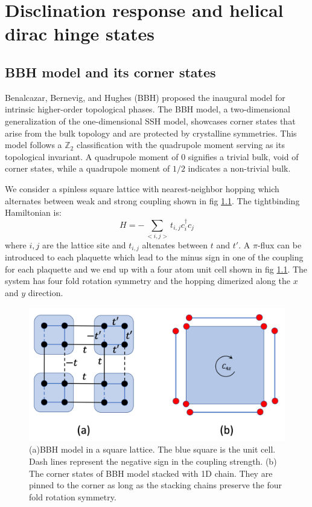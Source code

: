 \chapter{Disclination response and helical dirac hinge states}
\section{BBH model and its corner states}
Benalcazar, Bernevig, and Hughes (BBH) proposed the inaugural model for intrinsic higher-order topological phases\cite{benalcazar2017quantized}. The BBH model, a two-dimensional generalization of the one-dimensional SSH model, showcases corner states that arise from the bulk topology and are protected by crystalline symmetries. This model follows a $\mathbb{Z}_2$ classification with the quadrupole moment serving as its topological invariant. A quadrupole moment of 0 signifies a trivial bulk, void of corner states, while a quadrupole moment of $1/2$ indicates a non-trivial bulk.

 We consider a spinless square lattice with nearest-neighbor hopping which alternates between weak and strong coupling shown in fig \ref{fig:bbh}. The tightbinding Hamiltonian is:
 \begin{equation}
     H=-\sum_{<i,j>}t_{i,j}c^\dagger_ic_j
 \end{equation}
 where $i,j$ are the lattice site and $t_{i,j}$ altenates between $t$ and $t'$. A $\pi$-flux can be introduced to each plaquette which lead to the minus sign in one of the coupling for each plaquette and we end up with a four atom unit cell  shown in fig \ref{fig:bbh}. The system has four fold rotation symmetry and the hopping dimerized along the $x$ and $y$ direction. 

  \begin{figure}[h]
    \centering
    \includegraphics[width =\textwidth]{images/bbh.png}
    \caption{(a)BBH model in a square lattice. The blue square is the unit cell. Dash lines represent the negative sign in the coupling strength. (b) The corner states of BBH model stacked with 1D chain. They are pinned to the corner as long as the stacking chains preserve the four fold rotation symmetry.}
    \label{fig:bbh}
\end{figure}

